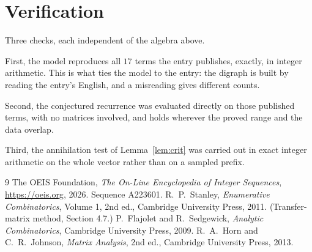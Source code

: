\documentclass[11pt,a4paper]{article}
\theoremstyle{plain}
\theoremstyle{definition}
\begin{document}
\section{Verification}

Three checks, each independent of the algebra above.

First, the model reproduces all $17$ terms the entry publishes, exactly, in integer
arithmetic. This is what ties the model to the entry: the digraph is built by reading the
entry's English, and a misreading gives different counts.

Second, the conjectured recurrence was evaluated directly on those published terms, with no
matrices involved, and holds wherever the proved range and the data overlap.

Third, the annihilation test of Lemma~\ref{lem:crit} was carried out in exact integer
arithmetic on the whole vector rather than on a sampled prefix.

\begin{thebibliography}{9}
 The OEIS Foundation, \emph{The On-Line Encyclopedia of Integer
Sequences}, \url{https://oeis.org}, 2026. Sequence A223601.
 R.~P.~Stanley, \emph{Enumerative Combinatorics}, Volume 1, 2nd ed.,
Cambridge University Press, 2011. (Transfer-matrix method, Section 4.7.)
 P.~Flajolet and R.~Sedgewick, \emph{Analytic Combinatorics}, Cambridge
University Press, 2009.
 R.~A.~Horn and C.~R.~Johnson, \emph{Matrix Analysis}, 2nd ed., Cambridge
University Press, 2013.
\end{thebibliography}
\end{document}

